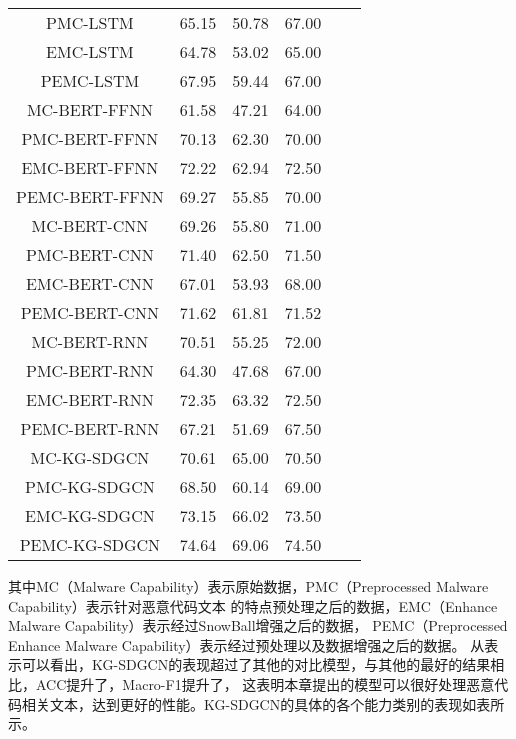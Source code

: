 \begin{table}[htb]
\begin{tabular}{c c c c c c }
		PMC-LSTM & 65.15 & 50.78 & 67.00 \\
		EMC-LSTM & 64.78 & 53.02 & 65.00 \\
		PEMC-LSTM & 67.95 & 59.44 & 67.00 \\
		MC-BERT-FFNN & 61.58 & 47.21 & 64.00 \\
		PMC-BERT-FFNN & 70.13 & 62.30 & 70.00 \\
		EMC-BERT-FFNN & 72.22 & 62.94 & 72.50 \\
		PEMC-BERT-FFNN & 69.27 & 55.85 & 70.00 \\
		MC-BERT-CNN & 69.26 & 55.80 & 71.00 \\
		PMC-BERT-CNN & 71.40 & 62.50 & 71.50 \\
		EMC-BERT-CNN & 67.01 & 53.93 & 68.00 \\
		PEMC-BERT-CNN & 71.62 & 61.81 & 71.52 \\
		MC-BERT-RNN & 70.51 & 55.25 & 72.00 \\
		PMC-BERT-RNN & 64.30 & 47.68 & 67.00 \\
		EMC-BERT-RNN & 72.35 & 63.32 & 72.50 \\
		PEMC-BERT-RNN & 67.21 & 51.69 & 67.50 \\
		MC-KG-SDGCN & 70.61 & 65.00 & 70.50 \\
		PMC-KG-SDGCN & 68.50 & 60.14 & 69.00 \\
		EMC-KG-SDGCN & 73.15 & 66.02 & 73.50 \\
		PEMC-KG-SDGCN & 74.64 & 69.06 & 74.50 \\
		\bottomrule[1.5pt] 
	\end{tabular}
\end{table}

其中MC（Malware Capability）表示原始数据，PMC（Preprocessed Malware Capability）表示针对恶意代码文本
的特点预处理之后的数据，EMC（Enhance Malware Capability）表示经过SnowBall增强之后的数据，
PEMC（Preprocessed Enhance Malware Capability）表示经过预处理以及数据增强之后的数据。
从表示可以看出，KG-SDGCN的表现超过了其他的对比模型，与其他的最好的结果相比，ACC提升了，Macro-F1提升了，
这表明本章提出的模型可以很好处理恶意代码相关文本，达到更好的性能。KG-SDGCN的具体的各个能力类别的表现如表所示。

